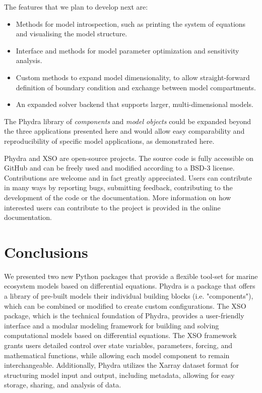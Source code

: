 \documentclass[journal abbreviation, manuscript]{copernicus}
\begin{document}
The features that we plan to develop next are: 

\begin{itemize}
    \item Methods for model introspection, such as printing the system of equations and visualising the model structure.
    \item Interface and methods for model parameter optimization and sensitivity analysis.
    \item Custom methods to expand model dimensionality, to allow straight-forward definition of boundary condition and exchange between model compartments.
    \item An expanded solver backend that supports larger, multi-dimensional models.
\end{itemize}

The Phydra library of \textit{components} and \textit{model objects} could be expanded beyond the three applications presented here and would allow easy comparability and reproducibility of specific model applications, as demonstrated here.

Phydra and XSO are open-source projects. The source code is fully accessible on GitHub and can be freely used and modified according to a BSD-3 license. Contributions are welcome and in fact greatly appreciated. Users can contribute in many ways by reporting bugs, submitting feedback, contributing to the development of the code or the documentation. More information on how interested users can contribute to the project is provided in the online documentation.


\section{Conclusions}


We presented two new Python packages that provide a flexible tool-set for marine ecosystem models based on differential equations. Phydra is a package that offers a library of pre-built models their individual building blocks (i.e. "components"), which can be combined or modified to create custom configurations. The XSO package, which is the technical foundation of Phydra, provides a user-friendly interface and a modular modeling framework for building and solving computational models based on differential equations. The XSO framework grants users detailed control over state variables, parameters, forcing, and mathematical functions, while allowing each model component to remain interchangeable. Additionally, Phydra utilizes the Xarray dataset format for structuring model input and output, including metadata, allowing for easy storage, sharing, and analysis of data.
\end{document}
